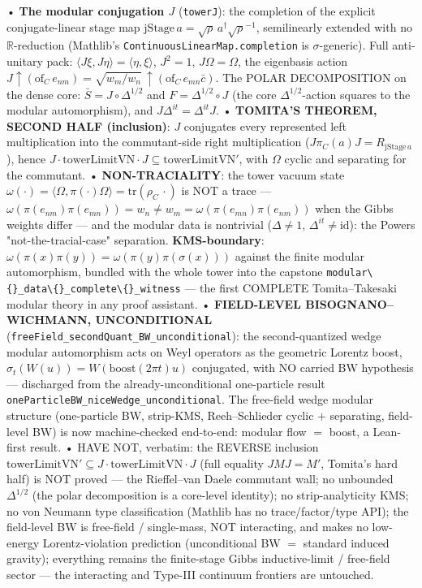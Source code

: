 \documentclass[11pt,a4paper]{article}
\begin{document}
  • \textbf{The modular conjugation $J$} (\texttt{towerJ}): the completion of the explicit conjugate-linear stage map $\mathrm{jStage}\,a = \sqrt{\rho}\,a^\dagger\sqrt{\rho}^{-1}$, semilinearly extended with no $\mathbb{R}$-reduction (Mathlib's \texttt{ContinuousLinearMap.completion} is $\sigma$-generic). Full anti-unitary pack: $\langle J\xi,J\eta\rangle = \langle\eta,\xi\rangle$, $J^2 = 1$, $J\Omega = \Omega$, the eigenbasis action $J\!\uparrow\!(\mathrm{of}_C\,e_{nm}) = \sqrt{w_m/w_n}\,\uparrow\!(\mathrm{of}_C\,e_{mn}\bar c)$. The POLAR DECOMPOSITION on the dense core: $\bar S = J\circ\Delta^{1/2}$ and $F = \Delta^{1/2}\circ J$ (the core $\Delta^{1/2}$-action squares to the modular automorphism), and $J\Delta^{it} = \Delta^{it}J$.
  • \textbf{TOMITA'S THEOREM, SECOND HALF (inclusion)}: $J$ conjugates every represented left multiplication into the commutant-side right multiplication ($J\pi_C(a)J = R_{\mathrm{jStage}\,a}$), hence $J\cdot\mathrm{towerLimitVN}\cdot J \subseteq \mathrm{towerLimitVN}'$, with $\Omega$ cyclic and separating for the commutant.
  • \textbf{NON-TRACIALITY}: the tower vacuum state $\omega(\cdot) = \langle\Omega,\pi(\cdot)\Omega\rangle = \mathrm{tr}(\rho_C\,\cdot)$ is NOT a trace — $\omega(\pi(e_{nm})\pi(e_{mn})) = w_n \ne w_m = \omega(\pi(e_{mn})\pi(e_{nm}))$ when the Gibbs weights differ — and the modular data is nontrivial ($\Delta \ne 1$, $\Delta^{it} \ne \mathrm{id}$): the Powers "not-the-tracial-case" separation. \textbf{KMS-boundary}: $\omega(\pi(x)\pi(y)) = \omega(\pi(y)\pi(\sigma(x)))$ against the finite modular automorphism, bundled with the whole tower into the capstone \texttt{modular\textbackslash\{\}\_data\textbackslash\{\}\_complete\textbackslash\{\}\_witness} — the first COMPLETE Tomita--Takesaki modular theory in any proof assistant.
  • \textbf{FIELD-LEVEL BISOGNANO--WICHMANN, UNCONDITIONAL} (\texttt{freeField\_secondQuant\_BW\_unconditional}): the second-quantized wedge modular automorphism acts on Weyl operators as the geometric Lorentz boost, $\sigma_t(W(u)) = W(\mathrm{boost}(2\pi t)u)$ conjugated, with NO carried BW hypothesis — discharged from the already-unconditional one-particle result \texttt{oneParticleBW\_niceWedge\_unconditional}. The free-field wedge modular structure (one-particle BW, strip-KMS, Reeh--Schlieder cyclic $+$ separating, field-level BW) is now machine-checked end-to-end: modular flow $=$ boost, a Lean-first result.
  • HAVE NOT, verbatim: the REVERSE inclusion $\mathrm{towerLimitVN}' \subseteq J\cdot\mathrm{towerLimitVN}\cdot J$ (full equality $JMJ = M'$, Tomita's hard half) is NOT proved — the Rieffel--van Daele commutant wall; no unbounded $\Delta^{1/2}$ (the polar decomposition is a core-level identity); no strip-analyticity KMS; no von Neumann type classification (Mathlib has no trace/factor/type API); the field-level BW is free-field / single-mass, NOT interacting, and makes no low-energy Lorentz-violation prediction (unconditional BW $=$ standard induced gravity); everything remains the finite-stage Gibbs inductive-limit / free-field sector — the interacting and Type-III continuum frontiers are untouched.
\end{document}
